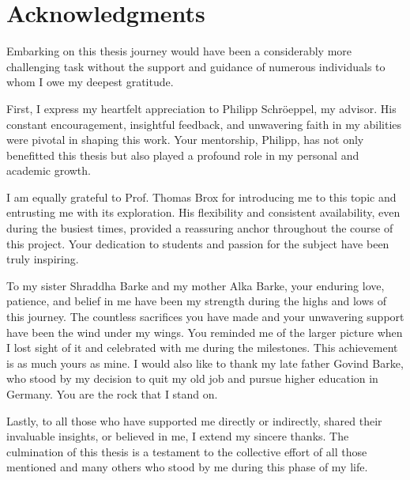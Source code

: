 \chapter{Acknowledgments}


Embarking on this thesis journey would have been a considerably more challenging task without the support and guidance of numerous individuals to whom I owe my deepest gratitude.

First, I express my heartfelt appreciation to Philipp Schröeppel, my advisor. His constant encouragement, insightful feedback, and unwavering faith in my abilities were pivotal in shaping this work. Your mentorship, Philipp, has not only benefitted this thesis but also played a profound role in my personal and academic growth.

I am equally grateful to Prof. Thomas Brox for introducing me to this topic and entrusting me with its exploration. His flexibility and consistent availability, even during the busiest times, provided a reassuring anchor throughout the course of this project. Your dedication to students and passion for the subject have been truly inspiring.

To my sister Shraddha Barke and my mother Alka Barke, your enduring love, patience, and belief in me have been my strength during the highs and lows of this journey. The countless sacrifices you have made and your unwavering support have been the wind under my wings. You reminded me of the larger picture when I lost sight of it and celebrated with me during the milestones. This achievement is as much yours as mine. I would also like to thank my late father Govind Barke, who stood by my decision to quit my old job and pursue higher education in Germany. You are the rock that I stand on. 

Lastly, to all those who have supported me directly or indirectly, shared their invaluable insights, or believed in me, I extend my sincere thanks. The culmination of this thesis is a testament to the collective effort of all those mentioned and many others who stood by me during this phase of my life.